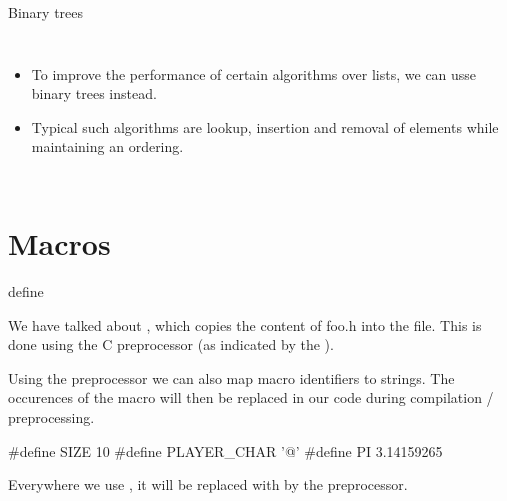 \documentclass[10pt,graphics,aspectratio=169,table]{beamer}
\begin{document}
\begin{frame}{Binary trees}
\begin{columns}[T]
		\begin{itemize}
            \item To improve the performance of certain algorithms over lists,
                  we can usse binary trees instead.
            \item Typical such algorithms are lookup, insertion and removal
                  of elements while maintaining an ordering.
		\end{itemize}
	\end{columns}
\end{frame}

\section{Macros}

\begin{frame}[fragile]{define}

We have talked about , which copies the content of
foo.h into the file.
This is done using the C preprocessor (as indicated by the \code{#}).

Using the preprocessor we can also map macro identifiers to strings.
The occurences of the macro will then be replaced in our code during
compilation / preprocessing.

\begin{codeblock}
#define SIZE 10
#define PLAYER_CHAR '@'
#define PI 3.14159265
\end{codeblock}

Everywhere we use , it will be replaced with  by the
preprocessor.
\end{frame}
\end{document}

